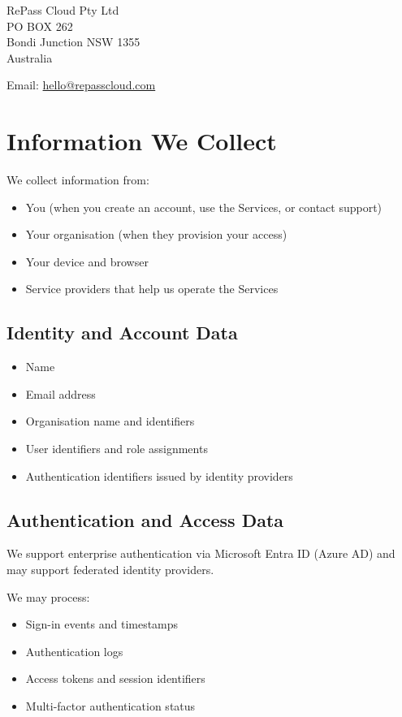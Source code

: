 \documentclass[11pt]{article}
\begin{document}
RePass Cloud Pty Ltd \\
PO BOX 262 \\
Bondi Junction NSW 1355 \\
Australia

Email: \href{mailto:hello@repasscloud.com}{hello@repasscloud.com}

\section{Information We Collect}

We collect information from:

\begin{itemize}
\item You (when you create an account, use the Services, or contact support)
\item Your organisation (when they provision your access)
\item Your device and browser
\item Service providers that help us operate the Services
\end{itemize}

\subsection{Identity and Account Data}

\begin{itemize}
\item Name
\item Email address
\item Organisation name and identifiers
\item User identifiers and role assignments
\item Authentication identifiers issued by identity providers
\end{itemize}

\subsection{Authentication and Access Data}

We support enterprise authentication via Microsoft Entra ID (Azure AD) and may support federated identity providers.

We may process:

\begin{itemize}
\item Sign-in events and timestamps
\item Authentication logs
\item Access tokens and session identifiers
\item Multi-factor authentication status
\end{itemize}
\end{document}
